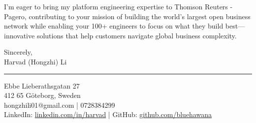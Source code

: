 \documentclass[a4paper,10pt]{article}
\begin{document}
I'm eager to bring my platform engineering expertise to Thomson Reuters - Pagero, contributing to your mission of building the world's largest open business network while enabling your 100+ engineers to focus on what they build best—innovative solutions that help customers navigate global business complexity.

\vspace{10pt}

Sincerely,\\
\vspace{15pt}
Harvad (Hongzhi) Li

\vspace{20pt}

{\color{darkblue}\rule{\linewidth}{0.6pt}}
\vspace{4pt}

{\color{darkblue}
Ebbe Lieberathsgatan 27\\
412 65 Göteborg, Sweden\\
hongzhili01@gmail.com | 0728384299\\
LinkedIn: \href{https://www.linkedin.com/in/harvad/}{linkedin.com/in/harvad} | GitHub: \href{https://github.com/bluehawana}{github.com/bluehawana}
}
\end{document}
